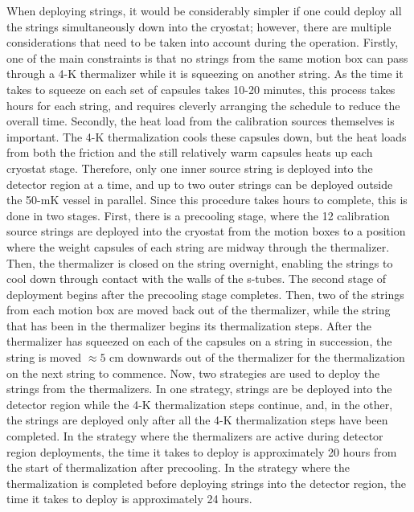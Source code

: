 When deploying strings, it would be considerably simpler if one could deploy all the strings simultaneously down into the cryostat; however, there are multiple considerations that need to be taken into account during the operation.
Firstly, one of the main constraints is that no strings from the same motion box can pass through a 4-K thermalizer while it is squeezing on another string.
As the time it takes to squeeze on each set of capsules takes 10-20 minutes, this process takes hours for each string, and requires cleverly arranging the schedule to reduce the overall time.
Secondly, the heat load from the calibration sources themselves is important.
The 4-K thermalization cools these capsules down, but the heat loads from both the friction and the still relatively warm capsules heats up each cryostat stage.
Therefore, only one inner source string is deployed into the detector region at a time, and up to two outer strings can be deployed outside the 50-mK vessel in parallel.
Since this procedure takes hours to complete, this is done in two stages.
First, there is a precooling stage, where the 12 calibration source strings are deployed into the cryostat from the motion boxes to a position where the weight capsules of each string are midway through the thermalizer.
Then, the thermalizer is closed on the string overnight, enabling the strings to cool down through contact with the walls of the s-tubes.
The second stage of deployment begins after the precooling stage completes. Then, two of the strings from each motion box are moved back out of the thermalizer, while the string that has been in the thermalizer begins its thermalization steps.
After the thermalizer has squeezed on each of the capsules on a string in succession, the string is moved $\approx5$ cm downwards out of the thermalizer for the thermalization on the next string to commence.
Now, two strategies are used to deploy the strings from the thermalizers.
In one strategy, strings are be deployed into the detector region while the 4-K thermalization steps continue, and, in the other, the strings are deployed only after all the 4-K thermalization steps have been completed.
In the strategy where the thermalizers are active during detector region deployments, the time it takes to deploy is approximately 20 hours from the start of thermalization after precooling.
In the strategy where the thermalization is completed before deploying strings into the detector region, the time it takes to deploy is approximately 24 hours.

